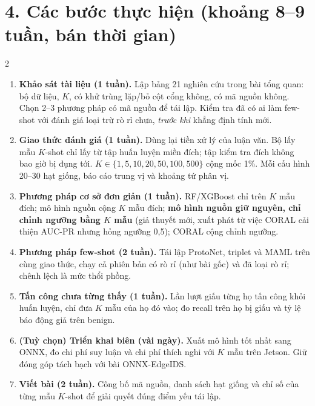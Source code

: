 \documentclass[10pt,a4paper,landscape]{article}
\begin{document}
\section*{4. Các bước thực hiện (khoảng 8--9 tuần, bán thời gian)}
\begin{multicols}{2}
\begin{enumerate}[label=\textbf{B\arabic*.}]
  \item \textbf{Khảo sát tài liệu (1 tuần).} Lập bảng 21 nghiên cứu trong bài tổng quan: bộ dữ liệu, $K$, có khử trùng lặp/bỏ cột cổng không, có mã nguồn không. Chọn 2--3 phương pháp có mã nguồn để tái lập. Kiểm tra đã có ai làm few-shot với đánh giá loại trừ rò rỉ chưa, \emph{trước khi} khẳng định tính mới.
  \item \textbf{Giao thức đánh giá (1 tuần).} Dùng lại tiền xử lý của luận văn. Bộ lấy mẫu $K$-shot chỉ lấy từ tập huấn luyện miền đích; tập kiểm tra đích không bao giờ bị đụng tới. $K \in \{1, 5, 10, 20, 50, 100, 500\}$ cộng mốc 1\%. Mỗi cấu hình 20--30 hạt giống, báo cáo trung vị và khoảng tứ phân vị.
  \item \textbf{Phương pháp cơ sở đơn giản (1 tuần).} RF/XGBoost chỉ trên $K$ mẫu đích; mô hình nguồn cộng $K$ mẫu đích; \textbf{mô hình nguồn giữ nguyên, chỉ chỉnh ngưỡng bằng $K$ mẫu} (giả thuyết mới, xuất phát từ việc CORAL cải thiện AUC-PR nhưng hỏng ngưỡng 0,5); CORAL cộng chỉnh ngưỡng.
  \item \textbf{Phương pháp few-shot (2 tuần).} Tái lập ProtoNet, triplet và MAML trên cùng giao thức, chạy cả phiên bản có rò rỉ (như bài gốc) và đã loại rò rỉ; chênh lệch là mức thổi phồng.
  \item \textbf{Tấn công chưa từng thấy (1 tuần).} Lần lượt giấu từng họ tấn công khỏi huấn luyện, chỉ đưa $K$ mẫu của họ đó vào; đo recall trên họ bị giấu và tỷ lệ báo động giả trên benign.
  \item \textbf{(Tuỳ chọn) Triển khai biên (vài ngày).} Xuất mô hình tốt nhất sang ONNX, đo chi phí suy luận và chi phí thích nghi với $K$ mẫu trên Jetson. Giữ đóng góp tách bạch với bài ONNX-EdgeIDS.
  \item \textbf{Viết bài (2 tuần).} Công bố mã nguồn, danh sách hạt giống và chỉ số của từng mẫu $K$-shot để giải quyết đúng điểm yếu tái lập.
\end{enumerate}
\end{multicols}
\end{document}
